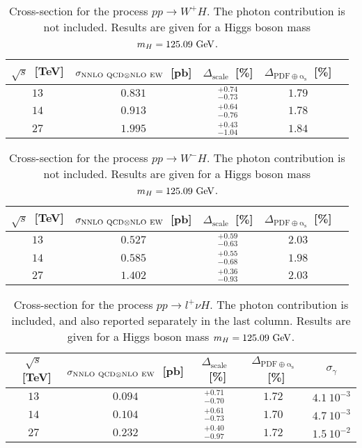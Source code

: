 \begin{table}
\centering
\begin{tabular}{ccccc}
\toprule
$\sqrt{s}$~[TeV] & $\sigma_{{\rm NNLO~QCD}\otimes{\rm NLO~EW}}$~[pb] & $\Delta_{\mathrm{scale}}$~[\%] &
$\Delta_{\mathrm{PDF\oplus\alpha_s}}$~[\%] \\
\midrule
$13$ & $0.831$ & $^{+0.74}_{-0.73}$ & $1.79$ \\
$14$ & $0.913$ & $^{+0.64}_{-0.76}$ & $1.78$ \\
$27$ & $1.995$ & $^{+0.43}_{-1.04}$ & $1.84$ \\
\bottomrule
\end{tabular}
\caption{Cross-section for the process $p p \to W^+H$. 
The photon contribution is not included. Results are given for a Higgs boson mass $m_H = 125.09~{\rm GeV}$.}
\label{tab:w+h_xsec}
\end{table}

\begin{table}
\centering
\begin{tabular}{ccccc}
\toprule
$\sqrt{s}$~[TeV] & $\sigma_{{\rm NNLO~QCD}\otimes{\rm NLO~EW}}$~[pb] & $\Delta_{\mathrm{scale}}$~[\%] &
$\Delta_{\mathrm{PDF\oplus\alpha_s}}$~[\%] \\
\midrule
$13$ & $0.527$ & $^{+0.59}_{-0.63}$ & $2.03$ \\
$14$ & $0.585$ & $^{+0.55}_{-0.68}$ & $1.98$ \\
$27$ & $1.402$ & $^{+0.36}_{-0.93}$ & $2.03$ \\
\bottomrule
\end{tabular}
\caption{Cross-section for the process $p p \to W^-H$. 
The photon contribution is not included. Results are given for a Higgs boson mass $m_H = 125.09~{\rm GeV}$.}
\label{tab:w-h_xsec}
\end{table}

\begin{table}
\centering
\begin{tabular}{cccc|c}
\toprule
$\sqrt{s}$~[TeV] & $\sigma_{{\rm NNLO~QCD}\otimes{\rm NLO~EW}}$~[pb] & $\Delta_{\mathrm{scale}}$~[\%] &
$\Delta_{\mathrm{PDF\oplus\alpha_s}}$~[\%] & $\sigma_\gamma$\\
\midrule
$13$ & $0.094$ & $^{+0.71}_{-0.70}$ & $1.72$ & $4.1~10^{-3}$\\
$14$ & $0.104$ & $^{+0.61}_{-0.73}$ & $1.70$ & $4.7~10^{-3}$\\
$27$ & $0.232$ & $^{+0.40}_{-0.97}$ & $1.72$ & $1.5~10^{-2}$\\
\bottomrule
\end{tabular}
\caption{Cross-section for the process $p p \to l^+\nu H$. 
The photon contribution is included, and also reported separately in the last column. 
Results are given for a Higgs boson mass $m_H = 125.09~{\rm GeV}$.}
\label{tab:l+nuh_xsec}
\end{table}

